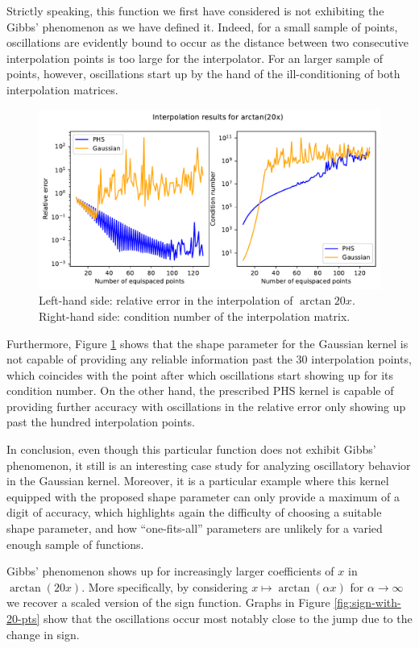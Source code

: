 \documentclass[12pt]{report} %
\begin{document}
Strictly speaking, this function we first have considered is not exhibiting the Gibbs' phenomenon as we have defined it. Indeed, for a small sample of points, oscillations are evidently bound to occur as the distance between two consecutive interpolation points is too large for the interpolator. For an larger sample of points, however, oscillations start up by the hand of the ill-conditioning of both interpolation matrices. 

\begin{figure}[ht]
    \centering
    \includegraphics[width=.8\textwidth]{imagenes/experiments/1d/intro/arctan20x-interpolation-curves.pdf}
    \caption{Left-hand side: relative error in the interpolation of $\arctan{20x}$. Right-hand side: condition number of the interpolation matrix.}
    \label{fig:arctan-with-curves}
\end{figure}

Furthermore, Figure \ref{fig:arctan-with-curves} shows that the shape parameter for the Gaussian kernel is not capable of providing any reliable information past the 30 interpolation points, which coincides with the point after which oscillations start showing up for its condition number. On the other hand, the prescribed PHS kernel is capable of providing further accuracy with oscillations in the relative error only showing up past the hundred interpolation points. 

In conclusion, even though this particular function does not exhibit Gibbs' phenomenon, it still is an interesting case study for analyzing oscillatory behavior in the Gaussian kernel. Moreover, it is a particular example where this kernel equipped with the proposed shape parameter can only provide a maximum of a digit of accuracy, which highlights again the difficulty of choosing a suitable shape parameter, and how ``one-fits-all'' parameters are unlikely for a varied enough sample of functions.

Gibbs' phenomenon shows up for increasingly larger coefficients of $x$ in $\arctan(20x)$. More specifically, by considering $x\mapsto \arctan(\alpha x)$ for $\alpha \to \infty$ we recover a scaled version of the sign function. Graphs in Figure \ref{fig:sign-with-20-pts} show that the oscillations occur most notably close to the jump due to the change in sign.
\end{document}
